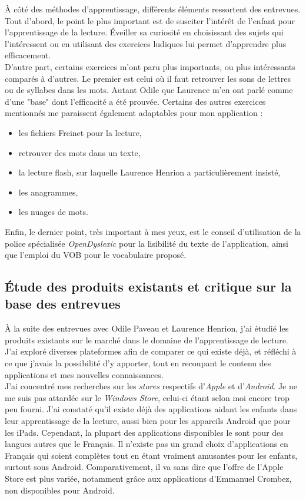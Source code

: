 À côté des méthodes d'apprentissage, différents éléments ressortent des entrevues. Tout d'abord, le point le plus important est de susciter l'intérêt de l'enfant pour l'apprentissage de la lecture. Éveiller sa curiosité en choisissant des sujets qui l'intéressent ou en utilisant des exercices ludiques lui permet d'apprendre plus efficacement.\\

D'autre part, certains exercices m'ont paru plus importants, ou plus intéressants comparés à d'autres. Le premier est celui où il faut retrouver les sons de lettres ou de syllabes dans les mots. Autant Odile que Laurence m'en ont parlé comme d'une "base" dont l'efficacité a été prouvée.
Certains des autres exercices mentionnés me paraissent également adaptables pour mon application :
\begin{itemize}
\item les fichiers Freinet pour la lecture,
\item retrouver des mots dans un texte,
\item la lecture flash, sur laquelle Laurence Henrion a particulièrement insisté,
\item les anagrammes,
\item les nuages de mots.\\
\end{itemize}

Enfin, le dernier point, très important à mes yeux, est le conseil d'utilisation de la police spécialisée \textit{OpenDyslexic} pour la lisibilité du texte de l'application, ainsi que l'emploi du VOB pour le vocabulaire proposé.

\subsection{Étude des produits existants et critique sur la base des entrevues}
À la suite des entrevues avec Odile Paveau et Laurence Henrion, j'ai étudié les produits existants sur le marché dans le domaine de l'apprentissage de lecture. J'ai exploré diverses plateformes afin de comparer ce qui existe déjà, et réfléchi à ce que j'avais la possibilité d'y apporter, tout en recoupant le contenu des applications et mes nouvelles connaissances.\\

J'ai concentré mes recherches sur les \textit{stores} respectifs d'\textit{Apple} et d'\textit{Android}. Je ne me suis pas attardée sur le \textit{Windows Store}, celui-ci étant selon moi encore trop peu fourni. J'ai constaté qu'il existe déjà des applications aidant les enfants dans leur apprentissage de la lecture, aussi bien pour les appareils Android que pour les iPads. Cependant, la plupart des applications disponibles le sont pour des langues autres que le Français. Il n'existe pas un grand choix d'applications en Français qui soient complètes tout en étant vraiment amusantes pour les enfants, surtout sous Android. Comparativement, il va sans dire que l'offre de l'Apple Store est plus variée, notamment grâce aux applications d'Emmanuel Crombez, non disponibles pour Android.\\

